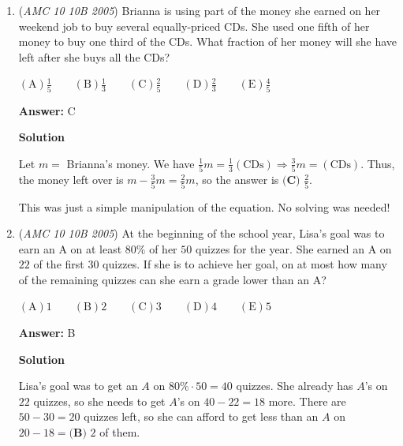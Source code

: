 \begin{enumerate}
 



\textbf{Solution 2 (Quick)}

Notice that the formula given is for the hypotenuse of any right triangle. As stated in the first solution, the negative signs did not matter. Therefore, we can think of this in terms of right triangles. Knowing the 5-12-13 Pythagorean triple, we find it to be simplified to
 \[(13 \diamond 13)\]Then, knowing the 45-45-90 degree triangle ratio, we find the answer to be 
 \[{(D)}\]~Thyauraisoverwhelming

 


	\item (\textit{AMC 10 10B 2005}) Brianna is using part of the money she earned on her weekend job to buy several equally-priced CDs. She used one fifth of her money to buy one third of the CDs. What fraction of her money will she have left after she buys all the CDs?


 $\mathrm{(A)} \frac{1}{5} \qquad \mathrm{(B)} \frac{1}{3} \qquad \mathrm{(C)} \frac{2}{5} \qquad \mathrm{(D)} \frac{2}{3} \qquad \mathrm{(E)} \frac{4}{5}$

 \textbf{Answer: }C



\textbf{Solution}

Let $m =$ Brianna's money.  We have $\frac15 m = \frac13 (\mbox{CDs}) \Rightarrow \frac35 m = (\mbox{CDs})$.  Thus, the money left over is $m-\frac35m = \frac25m$, so the answer is $\boxed{\textbf{(C) }\frac{2}{5}}$.

 This was just a simple manipulation of the equation. No solving was needed!

 


	\item (\textit{AMC 10 10B 2005}) At the beginning of the school year, Lisa's goal was to earn an A on at least $80\%$ of her $50$ quizzes for the year. She earned an A on $22$ of the first $30$ quizzes. If she is to achieve her goal, on at most how many of the remaining quizzes can she earn a grade lower than an A?


 $\mathrm{(A)} 1 \qquad \mathrm{(B)} 2 \qquad \mathrm{(C)} 3 \qquad \mathrm{(D)} 4 \qquad \mathrm{(E)} 5$

 \textbf{Answer: }B



\textbf{Solution}

Lisa's goal was to get an $A$ on $80\% \cdot 50 = 40$ quizzes.  She already has $A$'s on $22$ quizzes, so she needs to get $A$'s on $40-22=18$ more.  There are $50-30=20$ quizzes left, so she can afford to get less than an $A$ on $20-18=\boxed{\textbf{(B) }2}$ of them.


\end{enumerate}
